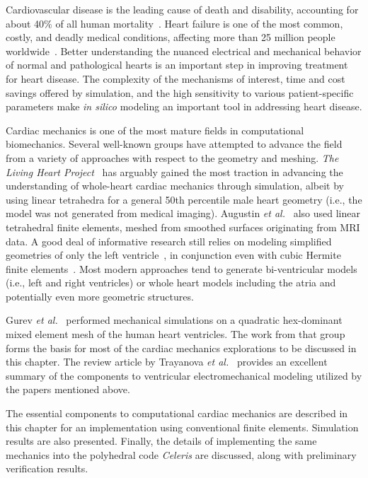 Cardiovascular disease is the leading cause of death and disability, accounting for about 40$\%$ of all human mortality~\cite{genet_2015}. Heart failure is one of the most common, costly, and deadly medical conditions, affecting more than 25 million people worldwide~\cite{mann_2015}. Better understanding the nuanced electrical and mechanical behavior of normal and pathological hearts is an important step in improving treatment for heart disease. The complexity of the mechanisms of interest, time and cost savings offered by simulation, and the high sensitivity to various patient-specific parameters make \textit{in silico} modeling an important tool in addressing heart disease.

Cardiac mechanics is one of the most mature fields in computational biomechanics. Several well-known groups have attempted to advance the field from a variety of approaches with respect to the geometry and meshing. \textit{The Living Heart Project}~\cite{baillargeon_2014, genet_2015} has arguably gained the most traction in advancing the understanding of whole-heart cardiac mechanics through simulation, albeit by using linear tetrahedra for a general 50th percentile male heart geometry (i.e., the model was not generated from medical imaging). Augustin \textit{et al.}~\cite{augustin_2016} also used linear tetrahedral finite elements, meshed from smoothed surfaces originating from MRI data. A good deal of informative research still relies on modeling simplified geometries of only the left ventricle~\cite{guccione_2005, sack_2016}, in conjunction even with cubic Hermite finite elements~\cite{mcculloch_2000}. Most modern approaches tend to generate bi-ventricular models (i.e., left and right ventricles) or whole heart models including the atria and potentially even more geometric structures.

Gurev \textit{et al.}~\cite{gurev_2015} performed mechanical simulations on a quadratic hex-dominant mixed element mesh of the human heart ventricles. The work from that group forms the basis for most of the cardiac mechanics explorations to be discussed in this chapter. The review article by Trayanova \textit{et al.}~\cite{trayanova_2011} provides an excellent summary of the components to ventricular electromechanical modeling utilized by the papers mentioned above.

The essential components to computational cardiac mechanics are described in this chapter for an implementation using conventional finite elements. Simulation results are also presented. Finally, the details of implementing the same mechanics into the polyhedral code \textit{Celeris} are discussed, along with preliminary verification results.

